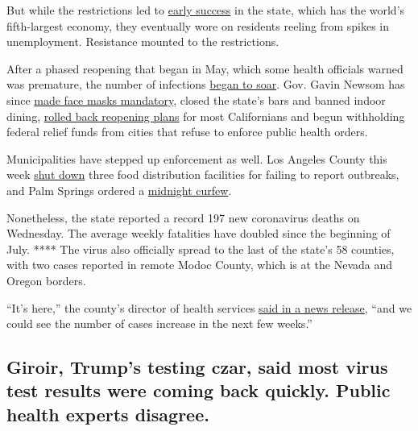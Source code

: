 But while the restrictions led to
\href{https://www.nytimes3xbfgragh.onion/2020/04/14/us/california-coronavirus-shutdown.html}{early
success} in the state, which has the world's fifth-largest economy, they
eventually wore on residents reeling from spikes in unemployment.
Resistance mounted to the restrictions.

After a phased reopening that began in May, which some health officials
warned was premature, the number of infections
\href{https://www.nytimes3xbfgragh.onion/2020/06/29/us/california-coronavirus-reopening.html}{began
to soar}. Gov. Gavin Newsom has since
\href{https://www.nytimes3xbfgragh.onion/interactive/2020/07/17/upshot/coronavirus-face-mask-map.html}{made
face masks mandatory}, closed the state's bars and banned indoor dining,
\href{https://www.nytimes3xbfgragh.onion/2020/07/14/us/california-counties-reopening.html}{rolled
back reopening plans} for most Californians and begun withholding
federal relief funds from cities that refuse to enforce public health
orders.

Municipalities have stepped up enforcement as well. Los Angeles County
this week
\href{https://www.latimes.com/california/story/2020-07-29/county-shuts-three-businesses-for-failing-to-report-coronavirus-outbreaks}{shut
down} three food distribution facilities for failing to report
outbreaks, and Palm Springs ordered a
\href{https://www.palmspringsca.gov/home/showdocument?id=75670}{midnight
curfew}.

Nonetheless, the state reported a record 197 new coronavirus deaths on
Wednesday. The average weekly fatalities have doubled since the
beginning of July. **** The virus also officially spread to the last of
the state's 58 counties, with two cases reported in remote Modoc County,
which is at the Nevada and Oregon borders.

``It's here,'' the county's director of health services
\href{http://modochealthservices.org/corona-virus}{said in a news
release}, ``and we could see the number of cases increase in the next
few weeks.''

\hypertarget{giroir-trumps-testing-czar-said-most-virus-test-results-were-coming-back-quickly-public-health-experts-disagree}{%
\subsection{Giroir, Trump's testing czar, said most virus test results
were coming back quickly. Public health experts
disagree.}\label{giroir-trumps-testing-czar-said-most-virus-test-results-were-coming-back-quickly-public-health-experts-disagree}}

